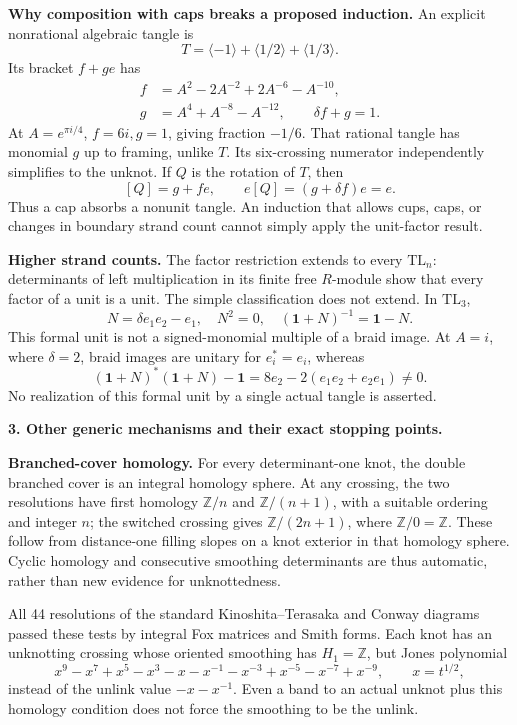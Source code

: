 \documentclass[10pt]{article}
\newcommand{\Z}{\mathbb Z}\newcommand{\Q}{\mathbb Q}
\newcommand{\TL}{\mathrm{TL}}\newcommand{\id}{\mathbf 1}
\begin{document}
\textbf{Why composition with caps breaks a proposed induction.}
An explicit nonrational algebraic tangle is
\[
 T=\langle-1\rangle+\langle1/2\rangle+\langle1/3\rangle.
\]
Its bracket \(f+ge\) has
\[
 \begin{split}
 f&=A^2-2A^{-2}+2A^{-6}-A^{-10},\\
 g&=A^4+A^{-8}-A^{-12},\qquad \delta f+g=1.
 \end{split}
\]
At \(A=e^{\pi i/4}\), \(f=6i,g=1\), giving fraction \(-1/6\).
That rational tangle has monomial \(g\) up to framing, unlike \(T\).
Its six-crossing numerator independently simplifies to the unknot.
If \(Q\) is the rotation of \(T\), then
\[
 [Q]=g+fe,\qquad e[Q]=(g+\delta f)e=e.
\]
Thus a cap absorbs a nonunit tangle. An induction that allows cups, caps, or
changes in boundary strand count cannot simply apply the unit-factor result.

\textbf{Higher strand counts.}
The factor restriction extends to every \(\TL_n\): determinants of left
multiplication in its finite free \(R\)-module show that every factor of a unit
is a unit. The simple classification does not extend. In \(\TL_3\),
\[
 N=\delta e_1e_2-e_1,\quad N^2=0,\quad
 (\id+N)^{-1}=\id-N.
\]
This formal unit is not a signed-monomial multiple of a braid image. At \(A=i\),
where \(\delta=2\), braid images are unitary for \(e_i^*=e_i\), whereas
\[
 (\id+N)^*(\id+N)-\id
 =8e_2-2(e_1e_2+e_2e_1)\ne0.
\]
No realization of this formal unit by a single actual tangle is asserted.

\newpage
\textbf{3. Other generic mechanisms and their exact stopping points.}

\textbf{Branched-cover homology.}
For every determinant-one knot, the double branched cover is an integral homology
sphere. At any crossing, the two resolutions have first homology
\(\Z/n\) and \(\Z/(n+1)\), with a suitable ordering and integer \(n\);
the switched crossing gives \(\Z/(2n+1)\), where \(\Z/0=\Z\).
These follow from distance-one filling slopes on a knot exterior in that homology
sphere. Cyclic homology and consecutive smoothing determinants are thus automatic,
rather than new evidence for unknottedness.

All 44 resolutions of the standard Kinoshita--Terasaka and Conway diagrams passed
these tests by integral Fox matrices and Smith forms. Each knot has an unknotting
crossing whose oriented smoothing has \(H_1=\Z\), but Jones polynomial
\[
 x^9-x^7+x^5-x^3-x-x^{-1}-x^{-3}+x^{-5}-x^{-7}+x^{-9},
 \qquad x=t^{1/2},
\]
instead of the unlink value \(-x-x^{-1}\).
Even a band to an actual unknot plus this homology condition does not force
the smoothing to be the unlink.
\end{document}
